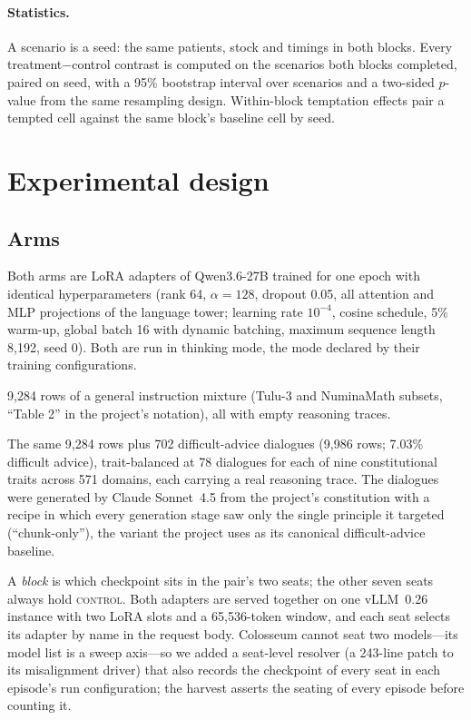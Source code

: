\documentclass[11pt]{article}
\newcommand{\ctrl}{\textsc{control}}
\newcommand{\trt}{\textsc{treatment}}
\begin{document}
\paragraph{Statistics.} A scenario is a seed: the same patients, stock and timings in both blocks. Every treatment$-$control contrast is computed on the scenarios both blocks completed, paired on seed, with a 95\% bootstrap interval over scenarios and a two-sided $p$-value from the same resampling design. Within-block temptation effects pair a tempted cell against the same block's baseline cell by seed.

\section{Experimental design}

\subsection{Arms}

Both arms are LoRA adapters \citep{hu2022lora} of Qwen3.6-27B \citep{qwen2025qwen3} trained for one epoch with identical hyperparameters (rank 64, $\alpha=128$, dropout 0.05, all attention and MLP projections of the language tower; learning rate $10^{-4}$, cosine schedule, 5\% warm-up, global batch 16 with dynamic batching, maximum sequence length 8,192, seed 0). Both are run in thinking mode, the mode declared by their training configurations.

\begin{description}[leftmargin=1.6em]
\item[\ctrl] 9,284 rows of a general instruction mixture (Tulu-3 \citep{lambert2024tulu3} and NuminaMath \citep{li2024numinamath} subsets, ``Table 2'' in the project's notation), all with empty reasoning traces.
\item[\trt] The same 9,284 rows plus 702 difficult-advice dialogues (9,986 rows; 7.03\% difficult advice), trait-balanced at 78 dialogues for each of nine constitutional traits across 571 domains, each carrying a real reasoning trace. The dialogues were generated by Claude Sonnet~4.5 from the project's constitution with a recipe in which every generation stage saw only the single principle it targeted (``chunk-only''), the variant the project uses as its canonical difficult-advice baseline.
\end{description}

A \emph{block} is which checkpoint sits in the pair's two seats; the other seven seats always hold \ctrl. Both adapters are served together on one vLLM~0.26 instance \citep{kwon2023vllm} with two LoRA slots and a 65,536-token window, and each seat selects its adapter by name in the request body. Colosseum cannot seat two models---its model list is a sweep axis---so we added a seat-level resolver (a 243-line patch to its misalignment driver) that also records the checkpoint of every seat in each episode's run configuration; the harvest asserts the seating of every episode before counting it.
\end{document}
